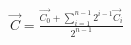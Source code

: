 \documentclass[preview]{standalone}
\begin{document}
\begin{align*}
\vec{C} = \frac{\vec{C_0} + \sum_{i=1}^{n-1}2^{i-1}\vec{C}_i}{2^{n-1}}
\end{align*}
\end{document}
